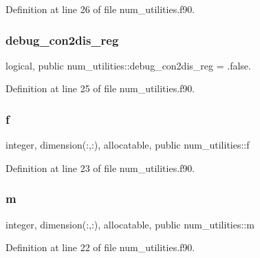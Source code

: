 Definition at line 26 of file num\+\_\+utilities.\+f90.

\mbox{\label{namespacenum__utilities_ab7138a230a3c494c7a2b71b2a7fffc0a}} 
\subsubsection{\texorpdfstring{debug\+\_\+con2dis\+\_\+reg}{debug\_con2dis\_reg}}
{\footnotesize\ttfamily logical, public num\+\_\+utilities\+::debug\+\_\+con2dis\+\_\+reg = .false.}



Definition at line 25 of file num\+\_\+utilities.\+f90.

\mbox{\label{namespacenum__utilities_a8e3399292fcb3a5fc35ae87f7811bbb5}} 
\subsubsection{\texorpdfstring{f}{f}}
{\footnotesize\ttfamily integer, dimension(\+:,\+:), allocatable, public num\+\_\+utilities\+::f}



Definition at line 23 of file num\+\_\+utilities.\+f90.

\mbox{\label{namespacenum__utilities_ad7a7ae2abf02a2df9e00b2aca669617c}} 
\subsubsection{\texorpdfstring{m}{m}}
{\footnotesize\ttfamily integer, dimension(\+:,\+:), allocatable, public num\+\_\+utilities\+::m}



Definition at line 22 of file num\+\_\+utilities.\+f90.

